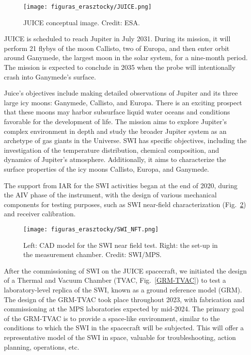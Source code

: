 \documentclass[baaa]{baaa}
\begin{document}
\begin{figure}[!t]
\centering
\texttt{[image: figuras\_erasztocky/JUICE.png]}
\caption{JUICE conceptual image. Credit: ESA.}
\label{JUICE}
\end{figure}

JUICE is scheduled to reach Jupiter in July 2031. During its mission, it will perform 21 flybys of the moon Callisto, two of Europa, and then enter orbit around Ganymede, the largest moon in the solar system, for a nine-month period. The mission is expected to conclude in 2035 when the probe will intentionally crash into Ganymede's surface.

Juice's objectives include making detailed observations of Jupiter and its three large icy moons: Ganymede, Callisto, and Europa. There is an exciting prospect that these moons may harbor subsurface liquid water oceans and conditions favorable for the development of life. The mission aims to explore Jupiter's complex environment in depth and study the broader Jupiter system as an archetype of gas giants in the Universe.
SWI has specific objectives, including the investigation of the temperature distribution, chemical composition, and dynamics of Jupiter's atmosphere. Additionally, it aims to characterize the surface properties of the icy moons Callisto, Europa, and Ganymede.

The support from IAR for the SWI activities began at the end of 2020, during the AIV phase of the instrument, with the design of various mechanical components for testing purposes, such as SWI near-field characterization (Fig.~\ref{SWI_NFT}) and receiver calibration. 

\begin{figure}[!t]
\centering
\texttt{[image: figuras\_erasztocky/SWI\_NFT.png]}
\caption{Left: CAD model for the SWI near field test. Right: the set-up in the measurement chamber. Credit: SWI/MPS.}
\label{SWI_NFT}
\end{figure}

After the commissioning of SWI on the JUICE spacecraft, we initiated the design of a Thermal and Vacuum Chamber (TVAC, Fig.~\ref{GRM-TVAC}) to test a laboratory-level replica of the SWI, known as a ground reference model (GRM). The design of the GRM-TVAC took place throughout 2023, with fabrication and commissioning at the MPS laboratories expected by mid-2024. The primary goal of the GRM-TVAC is to provide a space-like environment, similar to the conditions to which the SWI in the spacecraft will be subjected. This will offer a representative model of the SWI in space, valuable for troubleshooting, action planning, operations, etc.
\end{document}
